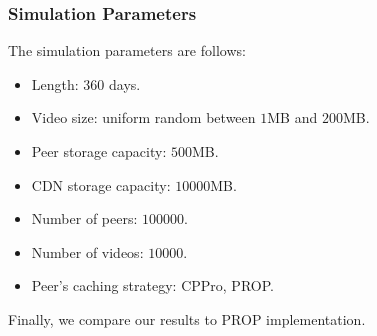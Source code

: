 \documentclass[10pt,final,journal,a4paper]{IEEEtran}
\begin{document}
\subsubsection{Simulation Parameters}
The simulation parameters are follows:
\begin{itemize}
\item Length: $360$ days.
\item Video size: uniform random between $1$MB and $200$MB.
\item Peer storage capacity: $500$MB.
\item CDN storage capacity: $10000$MB.
\item Number of peers: $100000$.
\item Number of videos: $10000$.
\item Peer's caching strategy: CPPro, PROP.
\end{itemize}
Finally, we compare our results to PROP \cite{1613869} implementation.


\end{document}
